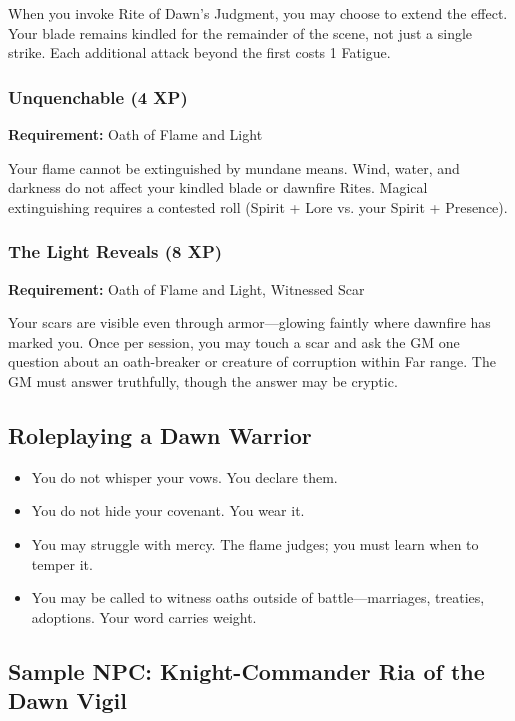 When you invoke Rite of Dawn's Judgment, you may choose to extend the effect. Your blade remains kindled for the remainder of the scene, not just a single strike. Each additional attack beyond the first costs 1 Fatigue.

\subsubsection{Unquenchable (4 XP)}

\textbf{Requirement:} Oath of Flame and Light

Your flame cannot be extinguished by mundane means. Wind, water, and darkness do not affect your kindled blade or dawnfire Rites. Magical extinguishing requires a contested roll (Spirit + Lore vs. your Spirit + Presence).

\subsubsection{The Light Reveals (8 XP)}

\textbf{Requirement:} Oath of Flame and Light, Witnessed Scar

Your scars are visible even through armor—glowing faintly where dawnfire has marked you. Once per session, you may touch a scar and ask the GM one question about an oath-breaker or creature of corruption within Far range. The GM must answer truthfully, though the answer may be cryptic.

\subsection{Roleplaying a Dawn Warrior}

\begin{itemize}
\item You do not whisper your vows. You declare them.
\item You do not hide your covenant. You wear it.
\item You may struggle with mercy. The flame judges; you must learn when to temper it.
\item You may be called to witness oaths outside of battle—marriages, treaties, adoptions. Your word carries weight.
\end{itemize}

\subsection{Sample NPC: Knight-Commander Ria of the Dawn Vigil}

